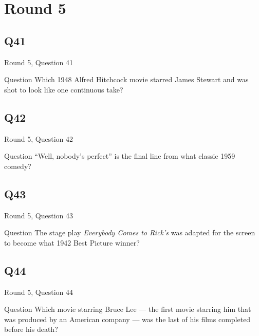 \documentclass[11pt]{beamer}
\begin{document}
\section{Round 5}
    

\subsection*{Q41}
\begin{frame}[t]{Round 5, Question 41}
\vspace{2em}
\begin{block}{Question}
Which 1948 Alfred Hitchcock movie starred James Stewart and was shot to look like one continuous take?
\end{block}
\end{frame}
    

\subsection*{Q42}
\begin{frame}[t]{Round 5, Question 42}
\vspace{2em}
\begin{block}{Question}
``Well, nobody's perfect'' is the final line from what classic 1959 comedy?
\end{block}
\end{frame}
    

\subsection*{Q43}
\begin{frame}[t]{Round 5, Question 43}
\vspace{2em}
\begin{block}{Question}
The stage play \emph{Everybody Comes to Rick's} was adapted for the screen to become what 1942 Best Picture winner?
\end{block}
\end{frame}
    

\subsection*{Q44}
\begin{frame}[t]{Round 5, Question 44}
\vspace{2em}
\begin{block}{Question}
Which movie starring Bruce Lee — the first movie starring him that was produced by an American company — was the last of his films completed before his death?
\end{block}
\end{frame}
    
\end{document}
